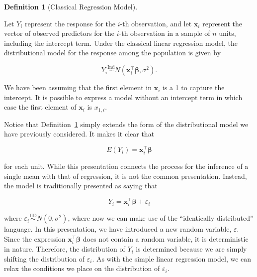 \documentclass[
  letterpaper,
  DIV=11,
  numbers=noendperiod]{scrreprt}
\theoremstyle{definition}
\newtheorem{definition}{Definition}[chapter]
\theoremstyle{plain}
\theoremstyle{definition}
\theoremstyle{remark}
\begin{document}
\begin{definition}[Classical Regression
Model]\protect\hypertarget{def-multiple-model}{}\label{def-multiple-model}

Let \(Y_i\) represent the response for the \(i\)-th observation, and let
\(\mathbf{x}_i\) represent the vector of observed predictors for the
\(i\)-th observation in a sample of \(n\) units, including the intercept
term. Under the classical linear regression model, the distributional
model for the response among the population is given by

\[Y_i \stackrel{\text{Ind}}{\sim} N\left(\mathbf{x}_i^\top \boldsymbol{\beta}, \sigma^2\right).\]

\end{definition}

\begin{tcolorbox}[enhanced jigsaw, breakable, colframe=quarto-callout-note-color-frame, titlerule=0mm, arc=.35mm, coltitle=black, opacitybacktitle=0.6, leftrule=.75mm, opacityback=0, left=2mm, toprule=.15mm, colbacktitle=quarto-callout-note-color!10!white, title=\textcolor{quarto-callout-note-color}{\faInfo}\hspace{0.5em}{Note}, bottomtitle=1mm, toptitle=1mm, rightrule=.15mm, bottomrule=.15mm, colback=white]

We have been assuming that the first element in \(\mathbf{x}_i\) is a 1
to capture the intercept. It is possible to express a model without an
intercept term in which case the first element of \(\mathbf{x}_i\) is
\(x_{1,i}\).

\end{tcolorbox}

Notice that Definition~\ref{def-multiple-model} simply extends the form
of the distributional model we have previously considered. It makes it
clear that

\[E\left(Y_i\right) = \mathbf{x}_i^\top \boldsymbol{\beta}\]

for each unit. While this presentation connects the process for the
inference of a single mean with that of regression, it is not the common
presentation. Instead, the model is traditionally presented as saying
that

\[Y_i = \mathbf{x}_i^\top \boldsymbol{\beta} + \varepsilon_i\]

where
\(\varepsilon_i \stackrel{\text{IID}}{\sim} N\left(0, \sigma^2\right)\),
where now we can make use of the ``identically distributed'' language.
In this presentation, we have introduced a new random variable,
\(\varepsilon\). Since the expression
\(\mathbf{x}_i^\top \boldsymbol{\beta}\) does not contain a random
variable, it is deterministic in nature. Therefore, the distribution of
\(Y_i\) is determined because we are simply shifting the distribution of
\(\varepsilon_i\). As with the simple linear regression model, we can
relax the conditions we place on the distribution of \(\varepsilon_i\).
\end{document}

